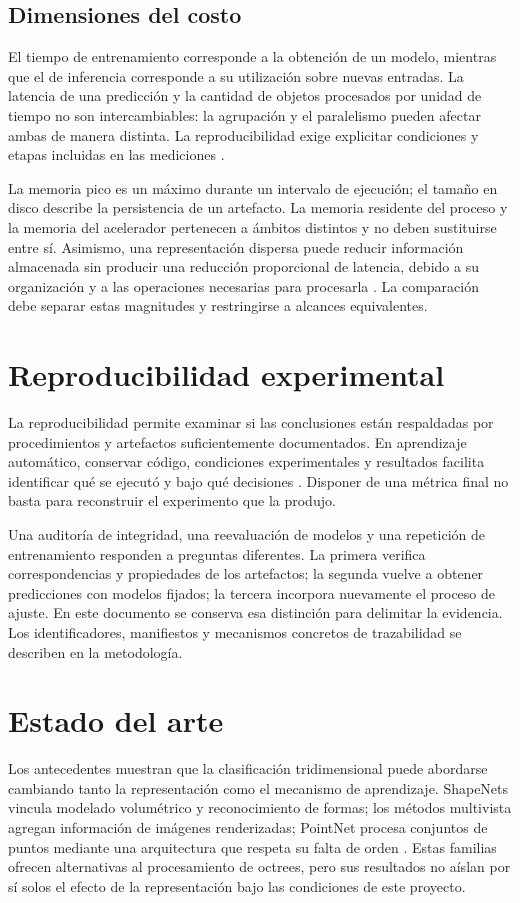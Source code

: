 \subsection{Dimensiones del costo}
El tiempo de entrenamiento corresponde a la obtención de un modelo, mientras que el de inferencia corresponde a su utilización sobre nuevas entradas. La latencia de una predicción y la cantidad de objetos procesados por unidad de tiempo no son intercambiables: la agrupación y el paralelismo pueden afectar ambas de manera distinta. La reproducibilidad exige explicitar condiciones y etapas incluidas en las mediciones \parencite{pineau2021}.

La memoria pico es un máximo durante un intervalo de ejecución; el tamaño en disco describe la persistencia de un artefacto. La memoria residente del proceso y la memoria del acelerador pertenecen a ámbitos distintos y no deben sustituirse entre sí. Asimismo, una representación dispersa puede reducir información almacenada sin producir una reducción proporcional de latencia, debido a su organización y a las operaciones necesarias para procesarla \parencite{samet,riegler2017}. La comparación debe separar estas magnitudes y restringirse a alcances equivalentes.

\section{Reproducibilidad experimental}
\label{sec:reproducibilidad}
La reproducibilidad permite examinar si las conclusiones están respaldadas por procedimientos y artefactos suficientemente documentados. En aprendizaje automático, conservar código, condiciones experimentales y resultados facilita identificar qué se ejecutó y bajo qué decisiones \parencite{pineau2021}. Disponer de una métrica final no basta para reconstruir el experimento que la produjo.

Una auditoría de integridad, una reevaluación de modelos y una repetición de entrenamiento responden a preguntas diferentes. La primera verifica correspondencias y propiedades de los artefactos; la segunda vuelve a obtener predicciones con modelos fijados; la tercera incorpora nuevamente el proceso de ajuste. En este documento se conserva esa distinción para delimitar la evidencia. Los identificadores, manifiestos y mecanismos concretos de trazabilidad se describen en la metodología.

\section{Estado del arte}
\label{sec:estado-arte}
Los antecedentes muestran que la clasificación tridimensional puede abordarse cambiando tanto la representación como el mecanismo de aprendizaje. ShapeNets vincula modelado volumétrico y reconocimiento de formas; los métodos multivista agregan información de imágenes renderizadas; PointNet procesa conjuntos de puntos mediante una arquitectura que respeta su falta de orden \parencite{wu2015,su2015,qi2017}. Estas familias ofrecen alternativas al procesamiento de octrees, pero sus resultados no aíslan por sí solos el efecto de la representación bajo las condiciones de este proyecto.

